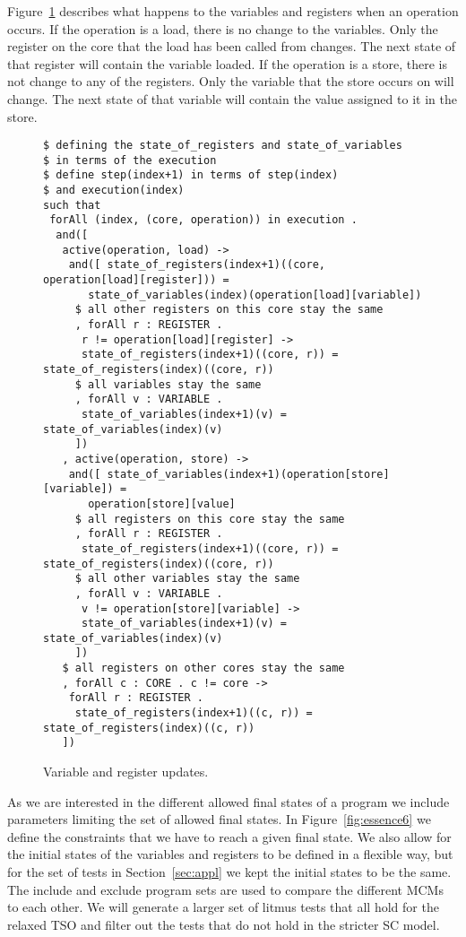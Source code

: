 \documentclass[runningheads]{llncs}
\begin{document}
Figure~\ref{fig:essence-step2} describes what happens to the variables and registers when an operation occurs.
If the operation is a load, there is no change to the variables.
Only the register on the core that the load has been called from changes.
The next state of that register will contain the variable loaded.
If the operation is a store, there is not change to any of the registers.
Only the variable that the store occurs on will change.
The next state of that variable will contain the value assigned to it in the store.

\begin{figure}
\begin{lstlisting}
$ defining the state_of_registers and state_of_variables
$ in terms of the execution
$ define step(index+1) in terms of step(index)
$ and execution(index)
such that
 forAll (index, (core, operation)) in execution .
  and([
   active(operation, load) ->
    and([ state_of_registers(index+1)((core, operation[load][register])) =
       state_of_variables(index)(operation[load][variable])
     $ all other registers on this core stay the same
     , forAll r : REGISTER .
      r != operation[load][register] ->
      state_of_registers(index+1)((core, r)) = state_of_registers(index)((core, r))
     $ all variables stay the same
     , forAll v : VARIABLE .
      state_of_variables(index+1)(v) = state_of_variables(index)(v)
     ])
   , active(operation, store) ->
    and([ state_of_variables(index+1)(operation[store][variable]) =
       operation[store][value]
     $ all registers on this core stay the same
     , forAll r : REGISTER .
      state_of_registers(index+1)((core, r)) = state_of_registers(index)((core, r))
     $ all other variables stay the same
     , forAll v : VARIABLE .
      v != operation[store][variable] ->
      state_of_variables(index+1)(v) = state_of_variables(index)(v)
     ])
   $ all registers on other cores stay the same
   , forAll c : CORE . c != core ->
    forAll r : REGISTER .
     state_of_registers(index+1)((c, r)) = state_of_registers(index)((c, r))
   ])
\end{lstlisting}
\caption{Variable and register updates. \label{fig:essence-step2}}
\end{figure}


As we are interested in the different allowed final states of a program we include parameters limiting the set of allowed final states.
In Figure~\ref{fig:essence6} we define the constraints that we have to reach a given final state.
We also allow for the initial states of the variables and registers to be defined in a flexible way, but for the set of tests in Section~\ref{sec:appl} we kept the initial states to be the same.
The include and exclude program sets are used to compare the different MCMs to each other.
We will generate a larger set of litmus tests that all hold for the relaxed TSO and filter out the tests that do not hold in the stricter SC model.
\end{document}
